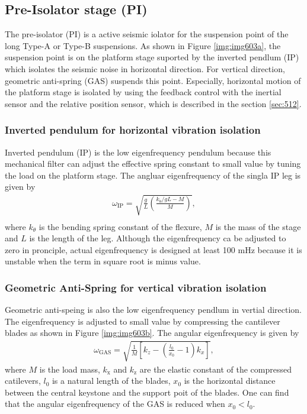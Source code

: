 \subsection{Pre-Isolator stage (PI)}
The pre-isolator (PI) is a active seismic iolator for the suspension point of the long Type-A or Type-B suspensions. As shown in Figure \ref{img:img603a}, the suspension point is on the platform stage suported by the inverted pendlum (IP) which isolates the seismic noise in horizontal direction. For vertical direction, geometric anti-spring (GAS) suspends this point. Especially, horizontal motion of the platform stage is isolated by using the feedback control with the inertial sensor and the relative position sensor, which is described in the section \cref{sec:512}.

\subsubsection{Inverted pendulum for horizontal vibration isolation}
Inverted pendulum (IP) is the low eigenfrequency pendulum because this mechanical filter can adjust the effective spring constant to small value by tuning the load on the platform stage. The angluar eigenfrequency of the singla IP leg is given by \cite{sekiguchi2016astudy}
\begin{eqnarray}
  \omega_{\mathrm{IP}}=\sqrt{\frac{g}{L}\left(\frac{k_{\mathrm{\theta}}/gL-M}{M}\right)},\\
\end{eqnarray}
where $k_{\theta}$ is the bending spring constant of the flexure, $M$ is the mass of the stage and $L$ is the length of the leg. Although the eigenfrequency ca be adjusted to zero in pronciple, actual eigenfrequency is designed at least 100 mHz because it is unstable when the term in square root is minus value.

\subsubsection{Geometric Anti-Spring for vertical vibration isolation}
Geometric anti-speing is also the low eigenfrequency pendlum in vertial direction. The eigenfrequency is adjusted to small value by compressing the cantilever blades as shown in Figure \ref{img:img603b}. The angular eigenfrequency is given by 
\begin{eqnarray}
  \omega_{\mathrm{GAS}} = \sqrt{\frac{1}{M}\left[{ k_{z}- \left(\frac{l_{0}}{x_{0}}-1\right) k_{x}}\right]},
\end{eqnarray}
where $M$ is the load mass, $k_{\mathrm{x}}$ and $k_{\mathrm{z}}$ are the elastic constant of the compressed catilevers, $l_{0}$ is a natural length of the blades, $x_0$ is the horizontal distance between the central keystone and the support poit of the blades. One can find that the angular eigenfrequency of the GAS is reduced when $x_{0}<l_{0}$.

